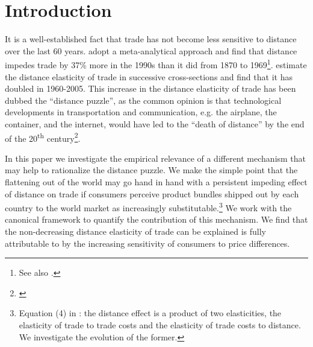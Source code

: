 \documentclass[12pt,twoside,a4paper,notitlepage]{article}
\begin{document}
\section*{Introduction}

It is a well-established fact that trade has not become less sensitive to distance over the last 60 years. 
\cite{Disdier2008} adopt a meta-analytical approach and find that distance impedes trade by 37\% more in the 1990s than it did from 1870 to 1969\footnote{See also \cite{Berthelon2008,Combes2006, Brun2005, Buch2004}.}. 
\cite{Head2013} estimate the distance elasticity of trade in successive cross-sections and find that it has doubled in 1960-2005.
This increase in the distance elasticity of trade has been dubbed the  ``distance puzzle'', as the common opinion is that technological developments in transportation and communication, e.g. the airplane, the container, and the internet, would have led to the ``death of distance'' by the end of the 20\textsuperscript{th} century\footnote{\cite{Cairncross1997,Levinson2006,Friedman2007}}.

In this paper we investigate the empirical relevance of a different mechanism that may help to rationalize the distance puzzle. We make the simple point that the flattening out of the world may go hand in hand with a persistent impeding effect of distance on trade if consumers perceive product bundles shipped out by each country to the world market as increasingly substitutable.\footnote{Equation (4) in \cite{Head2013}: the distance effect is a product of two elasticities, the elasticity of trade to trade costs and the elasticity of trade costs to distance. We investigate the evolution of the former.} We work with the canonical \cite{anderson2003} framework to quantify the contribution of this mechanism. We find that the non-decreasing distance elasticity of trade can be explained  is fully attributable to \fi by the increasing sensitivity of consumers to price differences.  
\end{document}
